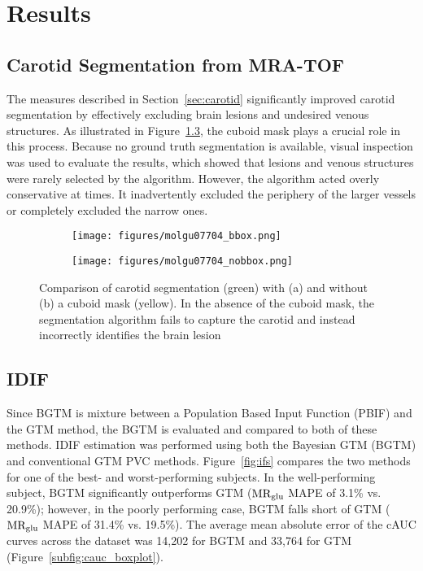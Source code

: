 \chapter{Results}
\section{Carotid Segmentation from MRA-TOF}
The measures described in Section~\ref{sec:carotid} significantly improved carotid segmentation by effectively excluding brain lesions and undesired venous structures.
As illustrated in Figure~\ref{fig:seg_compare}, the cuboid mask plays a crucial role in this process.
Because no ground truth segmentation is available, visual inspection was used to evaluate the results, which showed that lesions and venous structures were rarely selected by the algorithm.
However, the algorithm acted overly conservative at times. It inadvertently excluded the periphery of the larger vessels or completely excluded the narrow ones.
\begin{figure}[h]
	\centering
	\begin{subfigure}{0.45\textwidth}
		\texttt{[image: figures/molgu07704\_bbox.png]}
		\caption{}
		\label{subfig:seg_bbox}
	\end{subfigure}
	\begin{subfigure}{0.45\textwidth}
		\texttt{[image: figures/molgu07704\_nobbox.png]}
		\caption{}
		\label{subfig:seg_nobbox}
	\end{subfigure}
	\caption{Comparison of carotid segmentation (green) with (a) and without (b) a cuboid mask (yellow). In the absence of the cuboid mask, the segmentation algorithm fails to capture the carotid and instead incorrectly identifies the brain lesion}
	\label{fig:seg_compare}
\end{figure}
\section{IDIF}
Since BGTM is mixture between a Population Based Input Function (PBIF) and the GTM method, the BGTM is evaluated and compared to both of these methods.
IDIF estimation was performed using both the Bayesian GTM (BGTM) and conventional GTM PVC methods.
Figure~\ref{fig:ifs} compares the two methods for one of the best- and worst-performing subjects.
In the well-performing subject, BGTM significantly outperforms GTM ($\text{MR}_{\text{glu}}$ MAPE of 3.1\% vs. 20.9\%); however, in the poorly performing case, BGTM falls short of GTM ($\text{MR}_{\text{glu}}$ MAPE of 31.4\% vs. 19.5\%).
The average mean absolute error of the cAUC curves across the dataset was 14,202 for BGTM and 33,764 for GTM (Figure~\ref{subfig:cauc_boxplot}).

